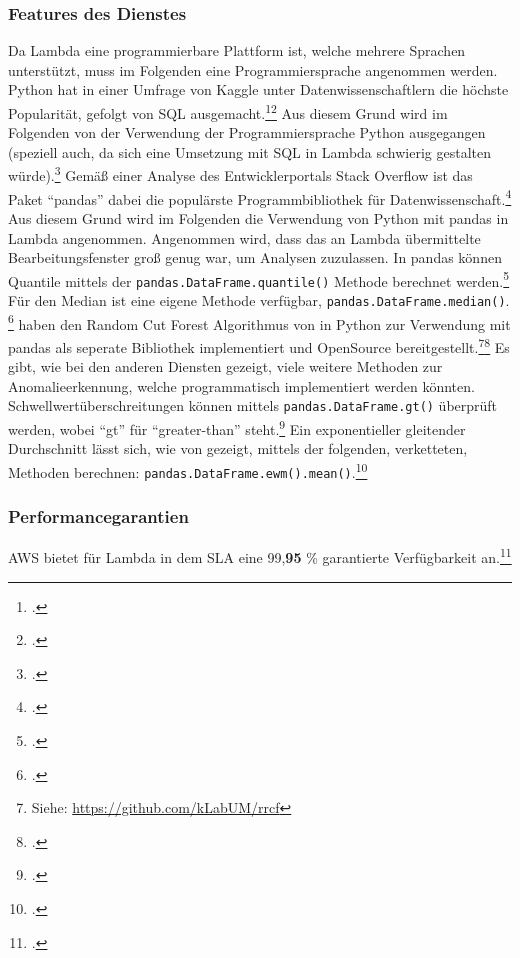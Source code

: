 \subsubsection{Features des Dienstes}
Da Lambda eine programmierbare Plattform ist, welche mehrere Sprachen unterstützt, muss im Folgenden eine Programmiersprache angenommen werden. Python hat in einer Umfrage von Kaggle unter Datenwissenschaftlern die höchste Popularität, gefolgt von \ac{SQL} ausgemacht.\footcite[Vgl.][]{KaggleInc..2019}\nzitat\footcite[Vgl.][]{Hayes.2020} Aus diesem Grund wird im Folgenden von der Verwendung der Programmiersprache Python ausgegangen (speziell auch, da sich eine Umsetzung mit \ac{SQL} in Lambda schwierig gestalten würde).\footcite[Vgl.][]{Hayes.2020} Gemäß einer Analyse des Entwicklerportals Stack Overflow ist das Paket \enquote{pandas} dabei die populärste Programmbibliothek für Datenwissenschaft.\footcite[Vgl.][]{Robinson.2017} Aus diesem Grund wird im Folgenden die Verwendung von Python mit pandas in Lambda angenommen. Angenommen wird, dass das an Lambda übermittelte Bearbeitungsfenster groß genug war, um Analysen zuzulassen.
\newcommand{\pandasmethod}[1]{\texttt{pandas.#1()}}
In pandas können Quantile mittels der \pandasmethod{DataFrame.quantile} Methode berechnet werden.\footcite[Vgl.][]{o.V..o.J.c} Für den Median ist eine eigene Methode verfügbar, \pandasmethod{DataFrame.median}. \footcite[Vgl.][]{o.V..o.J.d}
\citeauthor{Bartos.2019} haben den Random Cut Forest Algorithmus von \citeauthor{Guha.2016} in Python zur Verwendung mit pandas als seperate Bibliothek implementiert und OpenSource bereitgestellt.\footnote{Siehe: \url{https://github.com/kLabUM/rrcf}}\nzitat\footcite[Vgl.][]{Bartos.2019} Es gibt, wie bei den anderen Diensten gezeigt, viele weitere Methoden zur Anomalieerkennung, welche programmatisch implementiert werden könnten.
Schwellwertüberschreitungen können mittels \pandasmethod{DataFrame.gt} überprüft werden, wobei \enquote{gt} für \enquote{greater-than} steht.\footcite[Vgl.][]{o.V..o.J.e}
Ein exponentieller gleitender Durchschnitt lässt sich, wie von \citeauthor{Sharma.2019} gezeigt, mittels der folgenden, verketteten, Methoden berechnen: \pandasmethod{DataFrame.ewm().mean}.\footcite[Vgl.][]{Sharma.2019} 

\subsubsection{Performancegarantien}
\ac{AWS} bietet für Lambda in dem \ac{SLA} eine 99,\textbf{95} \% garantierte Verfügbarkeit an.\footcite[Vgl.][]{AmazonWebServicesInc..2019d}

